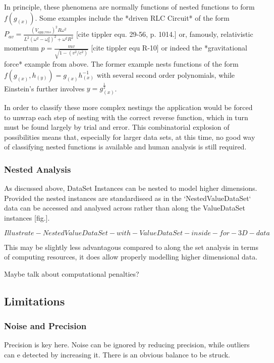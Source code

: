 \documentclass[main.tex]{subfiles}
\begin{document}
  In principle, these phenomena are normally functions of nested functions to form $f(g_{(x)})$. Some examples include the *driven RLC Circuit* of the form $P_{av}= \frac{ (V_{app\_rms})^2R\omega^2 }{ L^2(\omega^2-\omega_0^2)^2+\omega^2R^2 }$  [cite tippler equ. 29-56, p. 1014.] or, famously, relativistic momentum $p=\frac{m v}{\sqrt{1-(v^2/c^2)}}$ [cite tippler equ R-10] or indeed the *gravitational force* example from above. The former example nests functions of the form $f(g_{(x)},h_{(y)})=g_{(x)}h_{(x)}^{-1}$ with several second order polynomials, while Einstein's further involves $y=g_{(x)}^{\frac{1}{2}}$.
  
  In order to classify these more complex nestings the application would be forced to unwrap each step of nesting with the correct reverse function, which in turn must be found largely by trial and error. This combinatorial explosion of possibilities means that, especially for larger data sets, at this time, no good way of classifying nested functions is available and human analysis is still required.
  
  \subsubsection{Nested Analysis}
  
  As discussed above, DataSet Instances can be nested to model higher dimensions. Provided the nested instances are standardiseed as in the `NestedValueDataSet` data can be accessed and analysed across rather than along the ValueDataSet instances [fig.]. 
  
  \[Illustrate-NestedValueDataSet-with-ValueDataSet-inside-for-3D-data\]
  
  This may be slightly less advantagous compared to along the set analysis in terms of computing resources, it does allow properly modelling higher dimensional data. 
  
  Maybe talk about computational penalties? 
  
  \subsection{Limitations}
  \subsubsection{Noise and Precision}
  Precision is key here. Noise can be ignored by reducing precision, while outliers can e detected by increasing it. There is an obvious balance to be struck.
  
\end{document}
